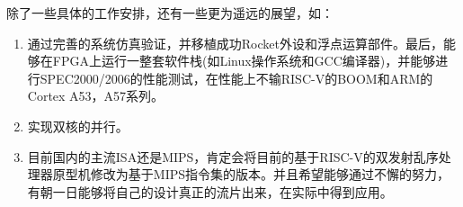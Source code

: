 	除了一些具体的工作安排，还有一些更为遥远的展望，如：
	\begin{enumerate}[label=(\arabic*)]
		\item 通过完善的系统仿真验证，并移植成功Rocket外设和浮点运算部件。最后，能够在FPGA上运行一整套软件栈(如Linux操作系统和GCC编译器)，并能够进行SPEC2000/2006的性能测试，在性能上不输RISC-V的BOOM和ARM的Cortex A53，A57系列。
		\item 实现双核的并行。
		\item 目前国内的主流ISA还是MIPS，肯定会将目前的基于RISC-V的双发射乱序处理器原型机修改为基于MIPS指令集的版本。并且希望能够通过不懈的努力，有朝一日能够将自己的设计真正的流片出来，在实际中得到应用。
	\end{enumerate}
	
	
